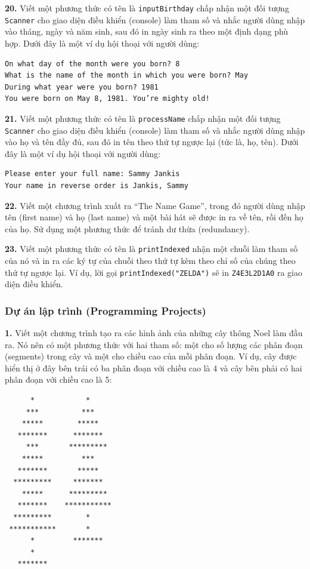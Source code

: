 \textbf{20.} Viết một phương thức có tên là \texttt{inputBirthday} chấp
nhận một đối tượng \texttt{Scanner} cho giao diện điều khiển (console)
làm tham số và nhắc người dùng nhập vào tháng, ngày và năm sinh, sau đó
in ngày sinh ra theo một định dạng phù hợp. Dưới đây là một ví dụ hội
thoại với người dùng:

\begin{verbatim}
On what day of the month were you born? 8
What is the name of the month in which you were born? May
During what year were you born? 1981
You were born on May 8, 1981. You’re mighty old!
\end{verbatim}

\textbf{21.} Viết một phương thức có tên là \texttt{processName} chấp
nhận một đối tượng \texttt{Scanner} cho giao diện điều khiển (console)
làm tham số và nhắc người dùng nhập vào họ và tên đầy đủ, sau đó in tên
theo thứ tự ngược lại (tức là, họ, tên). Dưới đây là một ví dụ hội thoại
với người dùng:

\begin{verbatim}
Please enter your full name: Sammy Jankis
Your name in reverse order is Jankis, Sammy
\end{verbatim}

\textbf{22.} Viết một chương trình xuất ra ``The Name Game'', trong đó
người dùng nhập tên (first name) và họ (last name) và một bài hát sẽ
được in ra về tên, rồi đến họ của họ. Sử dụng một phương thức để tránh
dư thừa (redundancy).

\textbf{23.} Viết một phương thức có tên là \texttt{printIndexed} nhận
một chuỗi làm tham số của nó và in ra các ký tự của chuỗi theo thứ tự
kèm theo chỉ số của chúng theo thứ tự ngược lại. Ví dụ, lời gọi
\texttt{printIndexed("ZELDA")} sẽ in \texttt{Z4E3L2D1A0} ra giao diện
điều khiển.

\subsubsection{Dự án lập trình (Programming
Projects)}\label{dux1ef1-uxe1n-lux1eadp-truxecnh-programming-projects}

\textbf{1.} Viết một chương trình tạo ra các hình ảnh của những cây
thông Noel làm đầu ra. Nó nên có một phương thức với hai tham số: một
cho số lượng các phân đoạn (segments) trong cây và một cho chiều cao của
mỗi phân đoạn. Ví dụ, cây được hiển thị ở đây bên trái có ba phân đoạn
với chiều cao là 4 và cây bên phải có hai phân đoạn với chiều cao là 5:

\begin{verbatim}
      *            *
     ***          ***
    *****        *****
   *******      *******
     ***       *********
    *****         ***
   *******       *****
  *********     *******
    *****      *********
   *******    ***********
  *********        *
 ***********       *
      *         *******
      *
   *******
\end{verbatim}


